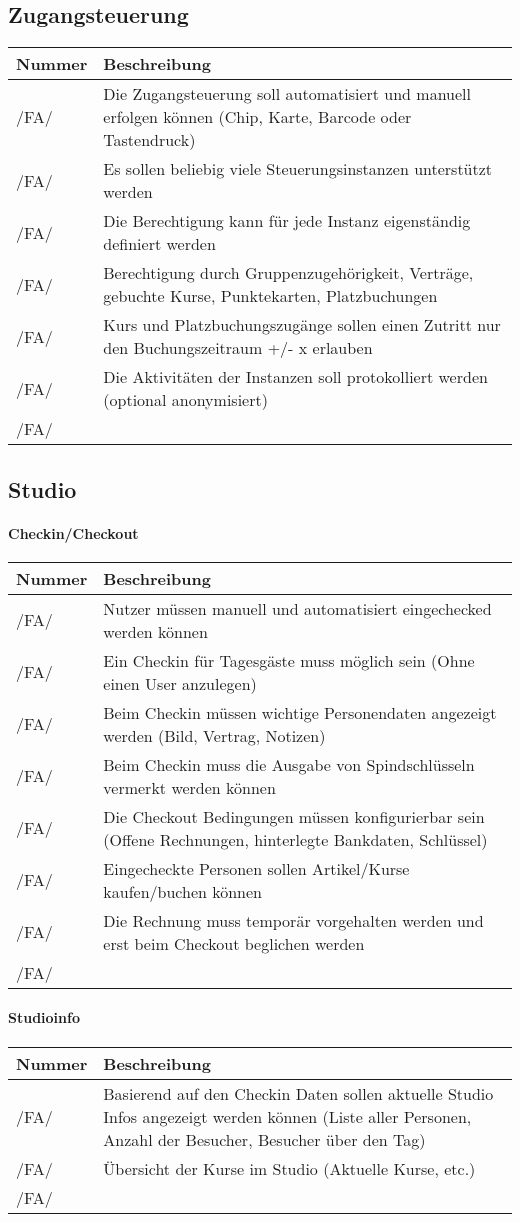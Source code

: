 \documentclass[a4paper,12pt]{article}
\newcommand\addrow[2]{#1 &#2\\ }
\newcommand\addheading[2]{#1 &#2\\ \hline}
\newcommand\tabularhead{\begin{tabular}{lp{13cm}}
\hline
}
\newenvironment{usecase}{\tabularhead}
{\hline\end{tabular}}
\begin{document}
\subsection{Zugangsteuerung}
\begin{usecase}
  \addheading{Nummer}{Beschreibung} 
  \addrow{/FA/}{Die Zugangsteuerung soll automatisiert und manuell erfolgen können (Chip, Karte, Barcode oder Tastendruck)}
  \addrow{/FA/}{Es sollen beliebig viele Steuerungsinstanzen unterstützt werden}
  \addrow{/FA/}{Die Berechtigung kann für jede Instanz eigenständig definiert werden}
  \addrow{/FA/}{Berechtigung durch Gruppenzugehörigkeit, Verträge, gebuchte Kurse, Punktekarten, Platzbuchungen}
  \addrow{/FA/}{Kurs und Platzbuchungszugänge sollen einen Zutritt nur den Buchungszeitraum +/- x erlauben}
  \addrow{/FA/}{Die Aktivitäten der Instanzen soll protokolliert werden (optional anonymisiert)}
  \addrow{/FA/}{}
\end{usecase}

\subsection{Studio}
\paragraph{\textbf{Checkin/Checkout}\\}
\begin{usecase}
  \addheading{Nummer}{Beschreibung} 
  \addrow{/FA/}{Nutzer müssen manuell und automatisiert eingechecked werden können}
  \addrow{/FA/}{Ein Checkin für Tagesgäste muss möglich sein (Ohne einen User anzulegen)}
  \addrow{/FA/}{Beim Checkin müssen wichtige Personendaten angezeigt werden (Bild, Vertrag, Notizen)}
  \addrow{/FA/}{Beim Checkin muss die Ausgabe von Spindschlüsseln vermerkt werden können}
  \addrow{/FA/}{Die Checkout Bedingungen müssen konfigurierbar sein (Offene Rechnungen, hinterlegte Bankdaten, Schlüssel)}
  \addrow{/FA/}{Eingecheckte Personen sollen Artikel/Kurse kaufen/buchen können}
  \addrow{/FA/}{Die Rechnung muss temporär vorgehalten werden und erst beim Checkout beglichen werden}
  \addrow{/FA/}{}
\end{usecase}

\paragraph{\textbf{Studioinfo}\\}
\begin{usecase}
  \addheading{Nummer}{Beschreibung} 
  \addrow{/FA/}{Basierend auf den Checkin Daten sollen aktuelle Studio Infos angezeigt werden können (Liste aller Personen, Anzahl der Besucher, Besucher über den Tag)}
  \addrow{/FA/}{Übersicht der Kurse im Studio (Aktuelle Kurse, etc.)}
  \addrow{/FA/}{}
\end{usecase}
\end{document}
